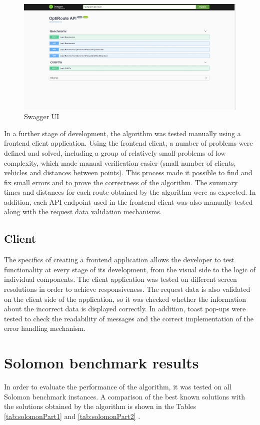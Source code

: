 \documentclass[a4paper,twoside,12pt]{book}
\begin{document}
\begin{figure}[htb]
\centering
\includegraphics[width=\textwidth]{images/swagger.jpg}
\caption{Swagger UI}
\label{fig:swagger}
\end{figure}


In a further stage of development, the algorithm was tested manually using a frontend client application. Using the frontend client, a number of problems were defined and solved, including a group of relatively small problems of low complexity, which made manual verification easier (small number of clients, vehicles and distances between points). This process made it possible to find and fix small errors and to prove the correctness of the algorithm. The summary times and distances for each route obtained by the algorithm were as expected. 
In addition, each API endpoint used in the frontend client was also manually tested along with the request data validation mechanisms. 

\subsection{Client}
The specifics of creating a frontend application allows the developer to test functionality at every stage of its development, from the visual side to the logic of individual components. The client application was tested on different screen resolutions in order to achieve responsiveness. The request data is also validated on the client side of the application, so it was checked whether the information about the incorrect data is displayed correctly. In addition, toast pop-ups were tested to check the readability of messages and the correct implementation of the error handling mechanism. 

\section{Solomon benchmark results}
In order to evaluate the performance of the algorithm, it was tested on all Solomon benchmark instances. A comparison of the best known solutions with the solutions obtained by the algorithm is shown in the Tables \ref{tab:solomonPart1} and \ref{tab:solomonPart2} \cite{bib:solomonSintef}.
\end{document}
